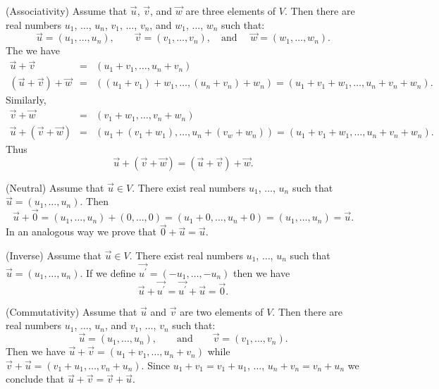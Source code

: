     (Associativity) Assume that \( \overrightarrow u \), \( \overrightarrow v \), and \( \overrightarrow w \) are three elements of \( V \). Then there are real numbers \( u_1 \), \( \dots \), \( u_n \), \( v_1 \), \( \dots \), \( v_n \), and \( w_1 \), \( \dots \), \( w_n \) such that: \[ \overrightarrow u=\left(u_1,\dots, u_n\right),\quad\quad \overrightarrow v=\left(v_1,\dots, v_n\right),\quad\mbox{and }\quad \overrightarrow w=\left(w_1,\dots, w_n\right).\] The we have \begin{eqnarray*} \overrightarrow u+\overrightarrow v&=&\left(u_1+v_1,\dots, u_n+v_n\right)\\ \left(\overrightarrow u+\overrightarrow v\right)+\overrightarrow w&=&\left((u_1+v_1)+w_1, \dots, (u_n+v_n)+w_n\right)=\left(u_1+v_1+w_1,\dots, u_n+v_n+w_n\right). \end{eqnarray*} Similarly, \begin{eqnarray*} \overrightarrow v+\overrightarrow w&=&\left(v_1+w_1,\dots, v_n+w_n\right)\\ \overrightarrow u+\left(\overrightarrow v+\overrightarrow w\right)&=&\left(u_1+(v_1+w_1), \dots, u_n+(v_w+w_n)\right)=\left(u_1+v_1+w_1,\dots, u_n+v_n+w_n\right). \end{eqnarray*} Thus \[ \overrightarrow u+(\overrightarrow v+\overrightarrow w)=(\overrightarrow u+\overrightarrow v)+\overrightarrow w.\]

    (Neutral) Assume that \( \overrightarrow u\in V \). There exist real numbers \( u_1 \), \( \dots \), \( u_n \) such that \( \overrightarrow u=\left(u_1,\dots, u_n\right) \). Then \[ \overrightarrow u+\overrightarrow 0=\left(u_1,\dots, u_n\right)+\left(0,\dots, 0\right)=\left(u_1+0,\dots, u_n+0\right)=\left(u_1,\dots, u_n\right)=\overrightarrow u.\] In an analogous way we prove that \( \overrightarrow 0+\overrightarrow u=\overrightarrow u \).

    (Inverse) Assume that \( \overrightarrow u\in V \). There exist real numbers \( u_1 \), \( \dots \), \( u_n \) such that \( \overrightarrow u=\left(u_1,\dots, u_n\right) \). If we define \( \overrightarrow{ u^{\prime}}=\left(-u_1,\dots, -u_n\right) \) then we have \[ \overrightarrow u+\overrightarrow{u^{\prime}}=\overrightarrow{ u^{\prime}}+\overrightarrow u=\overrightarrow 0.\]

    (Commutativity) Assume that \( \overrightarrow u \) and \( \overrightarrow v \) are two elements of \( V \). Then there are real numbers \( u_1 \), \( \dots \), \( u_n \), and \( v_1 \), \( \dots \), \( v_n \) such that: \[ \overrightarrow u=\left(u_1,\dots, u_n\right),\quad\quad \mbox{and}\quad\quad \overrightarrow v=\left(v_1,\dots, v_n\right).\] Then we have \( \overrightarrow u+\overrightarrow v=\left(u_1+v_1,\dots, u_n+v_n\right) \) while \( \overrightarrow v+\overrightarrow u=\left(v_1+u_1,\dots, v_n+u_n\right) \). Since \( u_1+v_1=v_1+u_1 \), \( \dots \), \( u_n+v_n=v_n+u_n \) we conclude that \( \overrightarrow u+\overrightarrow v=\overrightarrow v+\overrightarrow u \).

